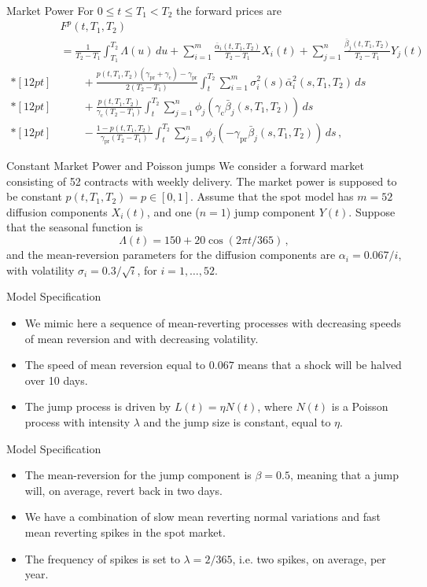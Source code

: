 {Market Power}
For $0\leq t\leq T_1<T_2$ the forward prices are
$$\begin{array}{ll}
& F^p(t,T_1,T_2)\\
&=\frac1{T_2-T_1}\int_{T_1}^{T_2}\Lambda(u)\,du
+\sum_{i=1}^m\frac{\bar{\alpha}_i(t,T_1,T_2)}{T_2-T_1}X_i(t)+
\sum_{j=1}^n\frac{\bar{\beta}_j(t,T_1,T_2)}{T_2-T_1}Y_j(t) \\*[12pt]
&\qquad+\frac{p(t,T_1,T_2)(\gamma_{\text{pr}}+
\gamma_{\text{c}})-\gamma_{\text{pr}}}{2(T_2-T_1)}\int_t^{T_2}
\sum_{i=1}^m\sigma_i^2(s)\bar{\alpha}_i^2(s,T_1,T_2)\,ds \\*[12pt]
&\qquad+\frac{p(t,T_1,T_2)}{\gamma_{\text{c}}(T_2-T_1)}\int_t^{T_2}
\sum_{j=1}^n\phi_j(\gamma_{\text{c}}\bar{\beta}_j(s,T_1,T_2))\,ds \\*[12pt]
&\qquad-\frac{1-p(t,T_1,T_2)}{\gamma_{\text{pr}}(T_2-T_1)}
\int_t^{T_2}\sum_{j=1}^n\phi_j(-\gamma_{\text{pr}}\bar{\beta}_j(s,T_1,T_2))
\,ds\,,
\end{array}
$$

{Constant Market Power and Poisson jumps}
We consider a forward market consisting of 52 contracts with weekly delivery.
The market power is supposed to be constant $p(t,T_1,T_2)=p\in[0,1]$.
Assume that the spot model has $m=52$ diffusion components $X_i(t)$, and
one ($n=1$) jump component $Y(t)$. Suppose that the seasonal
function is
$$
\Lambda(t)=150+20\cos(2\pi t/365)\,,
$$
and the mean-reversion parameters for the diffusion components are
$\alpha_i=0.067/i$, with volatility $\sigma_i=0.3/\sqrt{i}$, for
$i=1,\ldots,52$.

{Model Specification}

\begin{itemize}
\item<1-> We mimic here a sequence of mean-reverting
processes with decreasing speeds of mean reversion and with
decreasing volatility.
\item<2-> The speed of mean reversion equal to
$0.067$ means that a shock will be halved over 10 days.
\item<3-> The jump
process is driven by $L(t)=\eta N(t)$, where $N(t)$ is a Poisson
process with intensity $\lambda$ and the jump
 size is constant, equal to $\eta$.
\end{itemize}

{Model Specification}

\begin{itemize}
\item<1-> The mean-reversion for the jump component is $\beta=0.5$, meaning
that a jump will, on average, revert back in two days.
\item<2-> We have
a combination of slow mean reverting normal variations and fast mean
reverting spikes in the spot market.
\item<3-> The frequency of spikes is set
to $\lambda=2/365$, i.e. two spikes, on average, per year.

\end{itemize}

